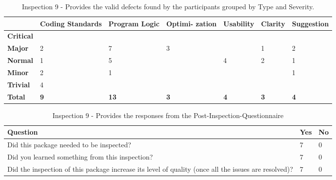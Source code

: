 \begin{table}[!h]
  \begin{center}
    \caption[Inspection 9 - Results by Type and Severity]{Inspection 9 -
      Provides the valid defects found by the participants grouped by Type
      and Severity.}
    \label{tab:inspection-results-9-type}
    \begin{tabular}{|p{2.0cm}|p{1.7cm}|p{1.5cm}|p{1.7cm}|p{1.4cm}|p{1.4cm}|p{1.5cm}|}  \hline   
\small{} & \small{}{\bf Coding Standards} & 
\small{}{\bf Program Logic} & \small{} {\bf Optimi- zation} & 
\small{}{\bf Usability} & \small{} {\bf Clarity} & 
\small{} {\bf Suggestion} \\ \hline

{\bf Critical} &   &   &   &   &   &   \\ \hline
{\bf Major}    & 2 & 7 & 3 &   & 1 & 2 \\ \hline
{\bf Normal}   & 1 & 5 &   & 4 & 2 & 1  \\ \hline
{\bf Minor}    & 2 & 1 &   &   &   & 1 \\ \hline
{\bf Trivial}  & 4 &   &   &   &   &   \\ \hline

{\bf Total} & {\bf 9} & {\bf 13} & {\bf 3} & {\bf 4} & {\bf 3} & {\bf 4} \\ \hline
    \end{tabular}
  \end{center}
\end{table}



\begin{table}[!h]
  \begin{center}
    \caption[Post Inspection 9 - Responses]{Inspection 9 - Provides the
      responses from the Post-Inspection-Questionnaire}
    \label{tab:post-inspection-questionnaire-results-9}
    \begin{tabular}{|p{8.0cm}|p{2.5cm}|p{2.5cm}|} \hline
{\bf Question} & {\bf Yes} & {\bf No} \\ \hline
Did this package needed to be inspected?  & 7 & 0 \\ \hline
Did you learned something from this inspection?  & 7 & 0 \\ \hline
Did the inspection of this package increase its level of quality (once all
the issues are resolved)? & 7 & 0 \\ \hline
    \end{tabular}
  \end{center}
\end{table}


